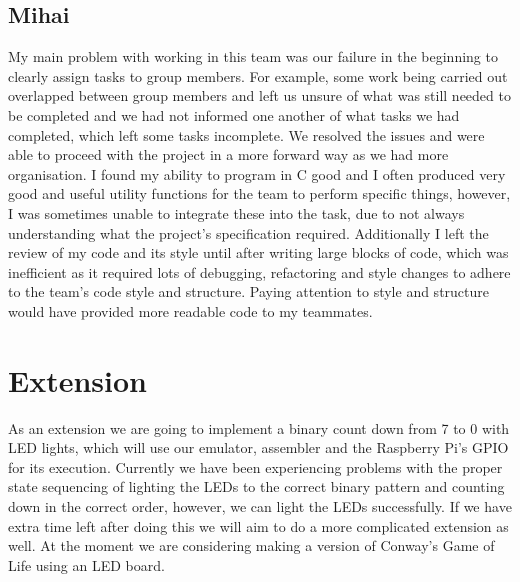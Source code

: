 \documentclass[11pt]{article}
\begin{document}
\subsection{Mihai}
My main problem with working in this team was our failure in the beginning to clearly assign tasks to group members. For example, some work being carried out overlapped between group members and left us unsure of what was still needed to be completed and we had not informed one another of what tasks we had completed, which left some tasks incomplete. We resolved the issues and were able to proceed with the project in a more forward way as we had more organisation. I found my ability to program in C good and I often produced very good and useful utility functions for the team to perform specific things, however, I was sometimes unable to integrate these into the task, due to not always understanding what the project’s specification required. Additionally I left the review of my code and its style until after writing large blocks of code, which was inefficient as it required lots of debugging, refactoring and style changes to adhere to the team’s code style and structure. Paying attention to style and structure would have provided more readable code to my teammates.

\section{Extension}  

As an extension we are going to implement a binary count down from 7 to 0 with LED lights, which will use our emulator, assembler and the Raspberry Pi’s GPIO for its execution. Currently we have been experiencing problems with the proper state sequencing of lighting the LEDs to the correct binary pattern and counting down in the correct order, however, we can light the LEDs successfully. If we have extra time left after doing this we will aim to do a more complicated extension as well. At the moment we are considering making a version of Conway's Game of Life using an LED board.

	
	
\end{document}
